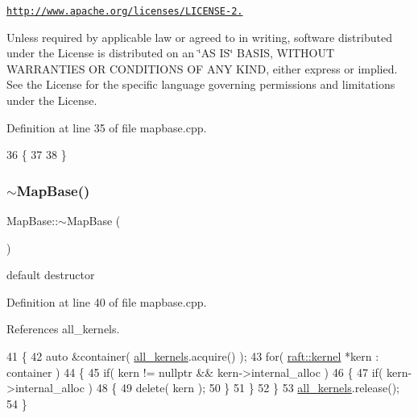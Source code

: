 \href{http://www.apache.org/licenses/LICENSE-2.0}{\tt http\+://www.\+apache.\+org/licenses/\+L\+I\+C\+E\+N\+S\+E-\/2.}

Unless required by applicable law or agreed to in writing, software distributed under the License is distributed on an \char`\"{}\+A\+S I\+S\char`\"{} B\+A\+S\+IS, W\+I\+T\+H\+O\+UT W\+A\+R\+R\+A\+N\+T\+I\+ES OR C\+O\+N\+D\+I\+T\+I\+O\+NS OF A\+NY K\+I\+ND, either express or implied. See the License for the specific language governing permissions and limitations under the License. 

Definition at line 35 of file mapbase.\+cpp.


\begin{DoxyCode}
36 \{
37   
38 \}
\end{DoxyCode}
\hypertarget{class_map_base_a6c62d788746d2161264b84ba66efcfbe}{}\label{class_map_base_a6c62d788746d2161264b84ba66efcfbe} 
\subsubsection{\texorpdfstring{$\sim$\+Map\+Base()}{~MapBase()}}
{\footnotesize\ttfamily Map\+Base\+::$\sim$\+Map\+Base (\begin{DoxyParamCaption}{ }\end{DoxyParamCaption})\hspace{0.3cm}{\ttfamily [virtual]}}

default destructor 

Definition at line 40 of file mapbase.\+cpp.



References all\+\_\+kernels.


\begin{DoxyCode}
41 \{
42    \textcolor{keyword}{auto} &container( \hyperlink{class_map_base_a2220cd630c5d00708f08d9bc70a48220}{all\_kernels}.acquire() );
43    \textcolor{keywordflow}{for}( \hyperlink{classraft_1_1kernel}{raft::kernel} *kern : container )
44    \{
45       \textcolor{keywordflow}{if}( kern != \textcolor{keyword}{nullptr} && kern->internal\_alloc ) 
46       \{   
47          \textcolor{keywordflow}{if}( kern->internal\_alloc )
48          \{
49             \textcolor{keyword}{delete}( kern );
50          \}
51       \}
52    \}
53    \hyperlink{class_map_base_a2220cd630c5d00708f08d9bc70a48220}{all\_kernels}.release();
54 \}
\end{DoxyCode}


